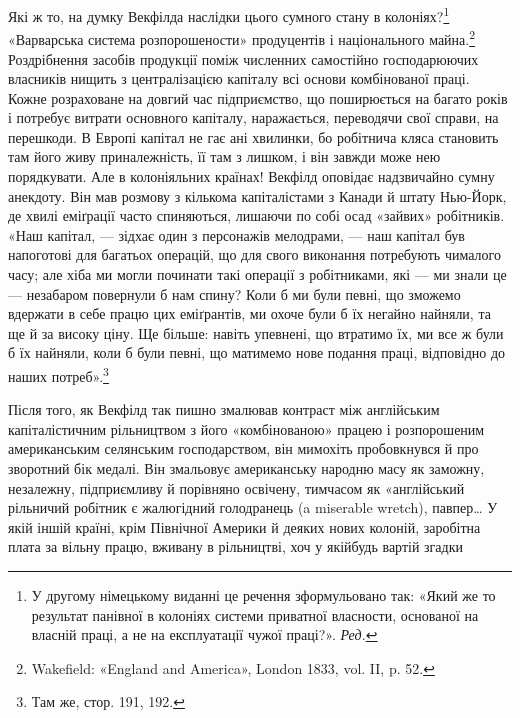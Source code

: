 Які ж то, на думку Векфілда наслідки цього сумного стану в колоніях?\footnote*{
У другому німецькому виданні це речення зформульовано так: «Який же то результат панівної в
колоніях системи приватної власности, основаної на власній праці, а не на експлуатації чужої
праці?». \emph{Ред.}
} «Варварська система
розпорошености» продуцентів і національного майна.\footnote{
Wakefield: «England and America», London 1833, vol. II, p. 52.
} Роздрібнення засобів
продукції поміж численних самостійно господарюючих власників нищить з централізацією капіталу всі
основи комбінованої праці. Кожне розраховане на довгий час підприємство, що поширюється на багато
років і потребує витрати основного капіталу, наражається, переводячи свої справи, на перешкоди. В
Европі капітал не гає ані хвилинки, бо робітнича кляса становить там його живу приналежність, її там
з лишком, і він завжди може нею порядкувати. Але в колоніяльних країнах! Векфілд
оповідає надзвичайно сумну анекдоту. Він мав розмову з кількома капіталістами з Канади й штату
Нью-Йорк, де хвилі еміґрації часто спиняються, лишаючи по собі осад «зайвих» робітників. «Наш
капітал, — зідхає один з персонажів мелодрами, — наш капітал був напоготові для багатьох операцій,
що для свого виконання потребують чималого часу; але хіба ми могли починати такі операції з
робітниками, які — ми знали це — незабаром повернули б нам спину? Коли б ми були певні, що зможемо
вдержати в себе працю цих еміґрантів, ми охоче були б їх негайно найняли, та ще й за високу ціну. Ще
більше: навіть упевнені, що втратимо їх, ми все ж були б їх найняли, коли б були певні, що матимемо
нове подання праці, відповідно до наших потреб».\footnote{Там же, стор. 191, 192.}

Після того, як Векфілд так пишно змалював контраст між англійським капіталістичним рільництвом з
його «комбінованою» працею і розпорошеним американським селянським господарством, він мимохіть
пробовкнувся й про зворотний бік
медалі. Він змальовує американську народню масу як заможну, незалежну, підприємливу й порівняно
освічену, тимчасом як «англійський рільничий робітник є жалюгідний голодранець (a miserable wretch),
павпер\dots{} У якій іншій країні, крім Північної Америки й деяких нових колоній, заробітна плата за
вільну працю, вживану в рільництві, хоч у якійбудь вартій згадки
\parbreak{}  %
